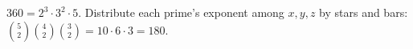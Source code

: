 $360=2^3\cdot3^2\cdot5$. Distribute each prime's exponent among $x,y,z$ by stars and bars: $\binom52\binom42\binom32=10\cdot6\cdot3=\boxed{180}$.
